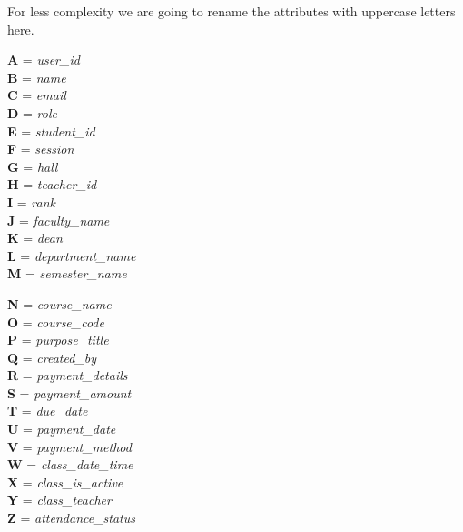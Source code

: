 For less complexity we are going to rename the attributes with uppercase letters here.\\
\begin{multicols}{2}
\begin{adjustwidth}{2cm}{}

\noindent 
\textbf{A} = \textit{user\_id}\\
\textbf{B} = \textit{name}\\
\textbf{C} = \textit{email}\\
\textbf{D} = \textit{role}\\
\textbf{E} = \textit{student\_id}\\
\textbf{F} = \textit{session}\\
\textbf{G} = \textit{hall}\\
\textbf{H} = \textit{teacher\_id}\\
\textbf{I} = \textit{rank}\\
\textbf{J} = \textit{faculty\_name}\\
\textbf{K} = \textit{dean}\\
\textbf{L} = \textit{department\_name}\\
\textbf{M} = \textit{semester\_name}\\
\vfill\null
\columnbreak

\noindent
\textbf{N} = \textit{course\_name}\\
\textbf{O} = \textit{course\_code}\\
\textbf{P} = \textit{purpose\_title}\\
\textbf{Q} = \textit{created\_by}\\
\textbf{R} = \textit{payment\_details}\\
\textbf{S} = \textit{payment\_amount}\\
\textbf{T} = \textit{due\_date}\\
\textbf{U} = \textit{payment\_date}\\
\textbf{V} = \textit{payment\_method}\\
\textbf{W} = \textit{class\_date\_time}\\
\textbf{X} = \textit{class\_is\_active}\\
\textbf{Y} = \textit{class\_teacher}\\
\textbf{Z} = \textit{attendance\_status}\\
\end{adjustwidth}

\end{multicols}

